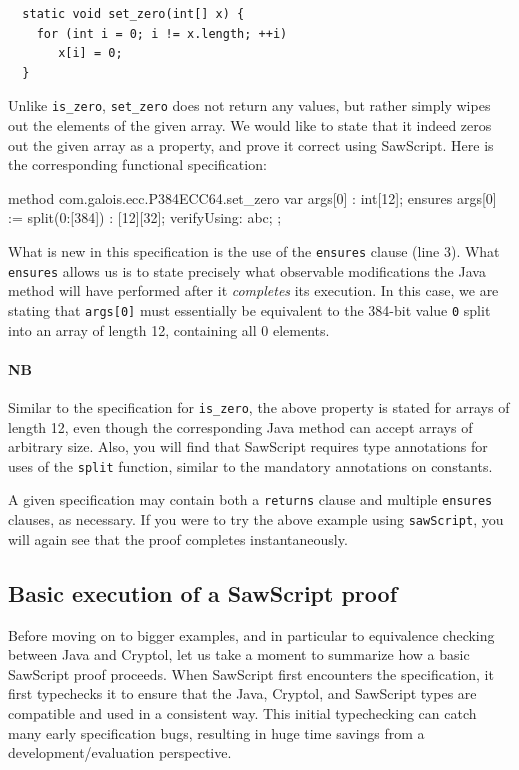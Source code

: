 \documentclass[12pt]{galois-whitepaper}
\newcommand{\sawScript}{{\sc SawScript}\xspace}
\begin{document}
\begin{Verbatim}
  static void set_zero(int[] x) {
    for (int i = 0; i != x.length; ++i)
       x[i] = 0;
  }
\end{Verbatim}

Unlike {\tt is\_zero}, {\tt set\_zero} does not return any values, but rather simply wipes out the elements of the given array. We would
like to state that it indeed zeros out the given array as a property, and prove it correct using \sawScript. Here is the corresponding functional specification:
\begin{code}[numbers=left]
  method com.galois.ecc.P384ECC64.set_zero {
    var args[0] : int[12];
    ensures args[0] := split(0:[384]) : [12][32];
    verifyUsing: abc;
  };
\end{code}
What is new in this specification is the use of the {\tt ensures} clause (line 3). What {\tt ensures} allows us is to state precisely
what observable modifications the Java method will have performed
after it {\em completes} its execution. In this case, we are stating that {\tt args[0]} must essentially be
equivalent to the 384-bit value {\tt 0} split into an array of length 12, containing all 0 elements.

\paragraph{NB} Similar to the specification for {\tt is\_zero}, the above property is stated for arrays of length
12, even though the corresponding Java method can accept
arrays of arbitrary size. Also, you will find that \sawScript requires type annotations for uses of the {\tt split} function, similar to the
mandatory annotations on constants.

A given specification may contain both a {\tt returns} clause and multiple {\tt ensures} clauses, as necessary. If you were to try the
above example using {\tt sawScript}, you will again see that the proof completes instantaneously.

\subsection{Basic execution of a \sawScript proof}\label{sec:proofexec}

Before moving on to bigger examples, and in particular to equivalence checking
between Java and Cryptol, let us take a moment to summarize how a basic
\sawScript proof proceeds. 
When \sawScript first encounters the specification, it first typechecks it
to ensure that the Java, Cryptol, and \sawScript types are compatible and
used in a consistent way.  This initial typechecking can catch many early
specification bugs, resulting in huge time savings from a development/evaluation perspective.
\end{document}
